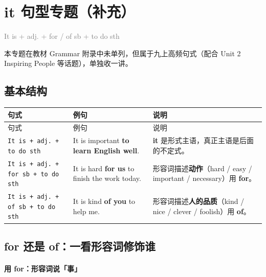 \documentclass[11pt,a4paper]{ctexart}
\begin{document}
\begin{center}\end{center}

\section{it 句型专题（补充）}
\noindent\textcolor{gray}{It is + adj. + for / of sb + to do sth}\par\smallskip
本专题在教材 Grammar 附录中未单列，但属于九上高频句式（配合 Unit 2 Inspiring People 等话题），单独收一讲。

\subsection*{基本结构}

{\footnotesize
\begin{longtable}{p{4.47cm}p{4.47cm}p{4.47cm}}
\hline
句式 & 例句 & 说明 \\
\hline
\endfirsthead
\hline
句式 & 例句 & 说明 \\
\hline
\endhead
\hline
\endfoot
\texttt{It is + adj. + to do sth} & It is important \textbf{to learn English well}. & \textbf{it} 是形式主语，真正主语是后面的不定式。 \\
\texttt{It is + adj. + for sb + to do sth} & It is hard \textbf{for us} to finish the work today. & 形容词描述\textbf{动作}（hard / easy / important / necessary）用 \textbf{for}。 \\
\texttt{It is + adj. + of sb + to do sth} & It is kind \textbf{of you} to help me. & 形容词描述\textbf{人的品质}（kind / nice / clever / foolish）用 \textbf{of}。 \\
\end{longtable}
}

\subsection*{for 还是 of：一看形容词修饰谁}

\paragraph{用 for：形容词说「事」}
\end{document}
